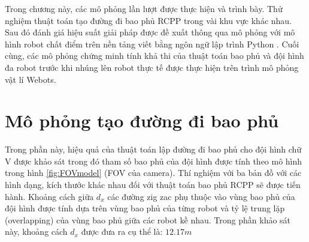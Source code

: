

Trong chương này, các mô phỏng lần lượt được thực hiện và trình bày. Thử nghiệm thuật toán tạo đường đi bao phủ RCPP trong vài khu vực khác nhau. Sau đó đánh giá hiệu suất giải pháp được đề xuất thông qua mô phỏng với mô hình robot chất điểm trên nền tảng viết bằng ngôn ngữ lập trình Python . Cuối cùng, các mô phỏng chứng minh tính khả thi của thuật toán bao phủ và đội hình đa robot trước khi nhúng lên robot thực tế được thực hiện trên trình mô phỏng vật lí Webots. 

\section{Mô phỏng tạo đường đi bao phủ}

Trong phần này, hiệu quả của thuật toán lập đường đi bao phủ cho đội hình chữ V được khảo sát trong đó tham số bao phủ của đội hình được tính theo mô hình trong hình \ref{fig:FOVmodel} (FOV của camera). Thí nghiệm với ba bản đồ với các hình dạng, kích thước khác nhau đối với thuật toán bao phủ RCPP sẽ được tiến hành. Khoảng cách giữa $d_x$ các đường zig zac phụ thuộc vào vùng bao phủ của đội hình được tính dựa trên vùng bao phủ của từng robot và tỷ lệ trung lặp (overlapping) của vùng bao phủ giữa các robot kề nhau. Trong phần khảo sát này, khoảng cách $d_{x}$ được đưa ra cụ thể là: $12.17m$

